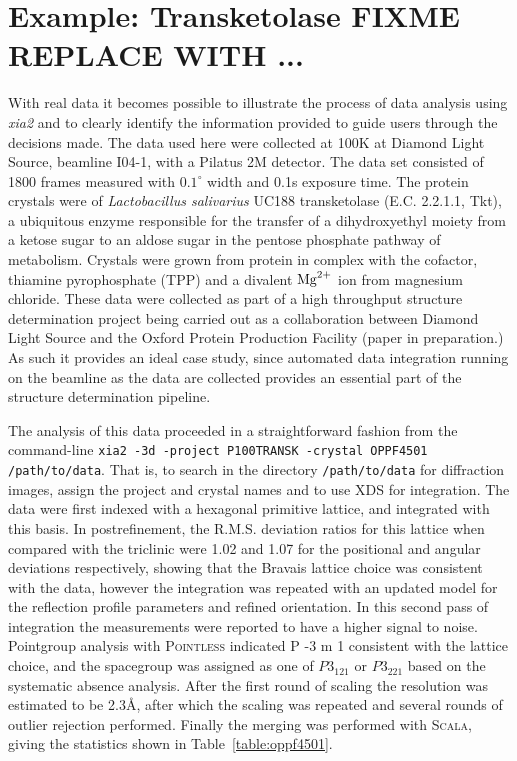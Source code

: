 \documentclass[a4paper, 11pt]{article}
\begin{document}
\section{Example: Transketolase FIXME REPLACE WITH ...}

With real data it becomes possible to illustrate the process of data
analysis using \emph{xia2} and to clearly identify the information
provided to guide users through the decisions made. The data
used here were collected at 100K at Diamond Light Source, beamline
I04-1, with a Pilatus 2M detector. The data set consisted of 1800
frames measured with $0.1^{\circ}$ width and 0.1s exposure time.
The protein crystals were of
\emph{Lactobacillus salivarius} UC188 transketolase (E.C. 2.2.1.1, Tkt), a
ubiquitous enzyme responsible for the transfer of a dihydroxyethyl
moiety from a ketose sugar to an aldose sugar in the pentose phosphate
pathway of metabolism. Crystals were grown from protein in complex
with the cofactor, thiamine pyrophosphate (TPP) and a divalent $\rm{Mg}^{2+}$
ion from magnesium chloride. These data were collected as part of
a high throughput structure determination project being carried out as
a collaboration between Diamond Light Source and the Oxford Protein
Production Facility (paper in preparation.) As such it provides an
ideal case study, since automated data integration running on the
beamline as the data are collected provides an essential part of the
structure determination pipeline. 

The analysis of this data proceeded in a straightforward fashion from
the command-line 
\verb|xia2 -3d -project P100TRANSK -crystal OPPF4501 /path/to/data|.
That is, to search in the directory \verb|/path/to/data| for
diffraction images, assign the project and crystal names and to use
XDS for integration. 
The data were first indexed with a hexagonal primitive lattice, and
integrated with this basis. In postrefinement, the R.M.S. deviation
ratios for this lattice when compared with the triclinic were 1.02 and
1.07 for the positional and angular deviations respectively, showing
that the Bravais lattice choice was consistent with the data, however
the integration was repeated with an updated model for the reflection
profile parameters
and refined orientation. In this second pass of integration the
measurements were reported to have a higher signal to noise. Pointgroup
analysis with \textsc{Pointless} indicated P -3 m 1 consistent with the lattice
choice, and the spacegroup was assigned as one of $P3_121$ or $P3_221$
based on the systematic absence analysis. After the first round of
scaling the resolution was estimated to be 2.3\AA, after which
the scaling was repeated and several rounds of outlier rejection
performed. Finally the merging was performed with \textsc{Scala}, giving the
statistics shown in Table~\ref{table:oppf4501}. 
\end{document}
